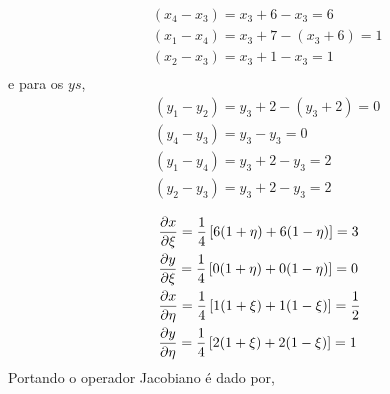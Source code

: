 \begin{itemize}
\begin{equation}
\begin{split}
		&	(x_4 - x_3) = x_3 + 6 - x_3 = 6\\
		&	(x_1 - x_4) = x_3 + 7 - (x_3 + 6) = 1\\\
		&	(x_2 - x_3) = x_3 + 1 - x_3 = 1\\
	\end{split}
	\end{equation}
	e para os $ys$,
	\begin{equation}
	\begin{split}
		&	(y_1 - y_2) = y_3 + 2 - (y_3 + 2) = 0 \\
		&	(y_4 - y_3) = y_3 - y_3 = 0\\
		&	(y_1 - y_4) = y_3 + 2 - y_3 = 2\\\
		&	(y_2 - y_3) = y_3 + 2 - y_3 = 2\\
	\end{split}
	\end{equation}
	\begin{equation}
	\begin{split}
		&	\frac{\partial x}{\partial \xi } = \frac{1}{4}\left[ 6(1 + \eta) + 6(1 - \eta) \right] = 3\\
		&   \frac{\partial y}{\partial \xi } = \frac{1}{4}\left[ 0(1 + \eta) + 0(1 - \eta) \right] = 0\\
		&   \frac{\partial x}{\partial \eta} = \frac{1}{4}\left[ 1(1 + \xi ) + 1(1 - \xi ) \right] = \frac{1}{2}\\
		&   \frac{\partial y}{\partial \eta} = \frac{1}{4}\left[ 2(1 + \xi ) + 2(1 - \xi ) \right] = 1
	\end{split}
	\end{equation}
	Portando o operador Jacobiano é dado por,


\end{itemize}
